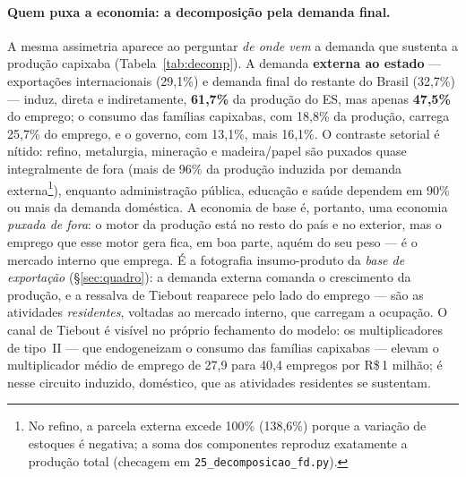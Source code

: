 \documentclass[11pt,a4paper]{article}
\begin{document}
\paragraph{Quem puxa a economia: a decomposição pela demanda final.}
A mesma assimetria aparece ao perguntar \emph{de onde vem} a demanda que sustenta a
produção capixaba (Tabela~\ref{tab:decomp}). A demanda \textbf{externa ao estado}
--- exportações internacionais (29,1\%) e demanda final do restante do Brasil (32,7\%)
--- induz, direta e indiretamente, \textbf{61,7\%} da produção do ES, mas apenas
\textbf{47,5\%} do emprego; o consumo das famílias capixabas, com 18,8\% da produção,
carrega 25,7\% do emprego, e o governo, com 13,1\%, mais 16,1\%. O contraste setorial
é nítido: refino, metalurgia, mineração e madeira/papel são puxados quase integralmente de fora (mais de 96\% da produção induzida por demanda externa\footnote{No refino, a
parcela externa excede 100\% (138,6\%) porque a variação de estoques é negativa; a soma
dos componentes reproduz exatamente a produção total (checagem em
\texttt{25\_decomposicao\_fd.py}).}), enquanto administração pública, educação e saúde dependem em 90\% ou mais da demanda doméstica. A economia de base é, portanto, uma economia \emph{puxada de fora}: o motor da produção está no resto do país e no exterior, mas o emprego que esse motor gera fica, em boa parte, aquém do seu peso --- é o mercado interno que emprega. É a fotografia insumo-produto da \emph{base de exportação}
(\S\ref{sec:quadro}): a demanda externa comanda o crescimento da produção, e a ressalva de Tiebout  reaparece pelo lado do emprego --- são as atividades \emph{residentes},
voltadas ao mercado interno, que carregam a ocupação. O canal de Tiebout 
é visível no próprio fechamento do modelo: os multiplicadores de tipo~II --- que
endogeneizam o consumo das famílias capixabas --- elevam o multiplicador médio de emprego de 27,9 para 40,4 empregos por R\$\,1 milhão; é nesse circuito induzido, doméstico, que as atividades residentes se sustentam.
\end{document}
